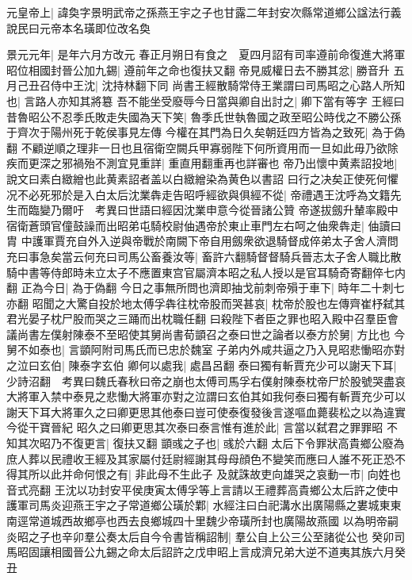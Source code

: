 元皇帝上|{
	諱奐字景明武帝之孫燕王宇之子也甘露二年封安次縣常道鄉公諡法行義說民曰元帝本名璜即位改名奐}


景元元年|{
	是年六月方改元}
春正月朔日有食之　夏四月詔有司率遵前命復進大將軍昭位相國封晉公加九錫|{
	遵前年之命也復扶又翻}
帝見威權日去不勝其忿|{
	勝音升}
五月己丑召侍中王沈|{
	沈持林翻下同}
尚書王經散騎常侍王業謂曰司馬昭之心路人所知也|{
	言路人亦知其將簒}
吾不能坐受廢辱今日當與卿自出討之|{
	卿下當有等字}
王經曰昔魯昭公不忍季氏敗走失國為天下笑|{
	魯季氏世執魯國之政至昭公時伐之不勝公孫于齊次于陽州死于乾侯事見左傳}
今權在其門為日久矣朝廷四方皆為之致死|{
	為于偽翻}
不顧逆順之理非一日也且宿衛空闕兵甲寡弱陛下何所資用而一旦如此毋乃欲除疾而更深之邪禍殆不測宜見重詳|{
	重直用翻重再也詳審也}
帝乃出懷中黄素詔投地|{
	說文曰素白緻繒也此黄素詔者盖以白緻繒染為黄色以書詔}
曰行之决矣正使死何懼况不必死邪於是入白太后沈業犇走告昭呼經欲與俱經不從|{
	帝禮遇王沈呼為文籍先生而臨變乃爾吁　考異曰世語曰經因沈業申意今從晉諸公贊}
帝遂拔劔升輦率殿中宿衛蒼頭官僮鼓譟而出昭弟屯騎校尉伷遇帝於東止車門左右呵之伷衆犇走|{
	伷讀曰胄}
中護軍賈充自外入逆與帝戰於南闕下帝自用劔衆欲退騎督成倅弟太子舍人濟問充曰事急矣當云何充曰司馬公畜養汝等|{
	畜許六翻騎督督騎兵晉志太子舍人職比散騎中書等侍郎時未立太子不應置東宫官屬濟本昭之私人授以是官耳騎奇寄翻倅七内翻}
正為今日|{
	為于偽翻}
今日之事無所問也濟即抽戈前刺帝殞于車下|{
	時年二十刺七亦翻}
昭聞之大驚自投於地太傅孚犇往枕帝股而哭甚哀|{
	枕帝於股也左傳齊崔杼弑其君光晏子枕尸股而哭之三踊而出枕職任翻}
曰殺陛下者臣之罪也昭入殿中召羣臣會議尚書左僕射陳泰不至昭使其舅尚書荀顗召之泰曰世之論者以泰方於舅|{
	方比也}
今舅不如泰也|{
	言顗阿附司馬氏而已忠於魏室}
子弟内外咸共逼之乃入見昭悲慟昭亦對之泣曰玄伯|{
	陳泰字玄伯}
卿何以處我|{
	處昌呂翻}
泰曰獨有斬賈充少可以謝天下耳|{
	少詩沼翻　考異曰魏氏春秋曰帝之崩也太傅司馬孚右僕射陳泰枕帝尸於股號哭盡哀大將軍入禁中泰見之悲慟大將軍亦對之泣謂曰玄伯其如我何泰曰獨有斬賈充少可以謝天下耳大將軍久之曰卿更思其他泰曰豈可使泰復發後言遂嘔血薨裴松之以為違實今從干寶晉紀}
昭久之曰卿更思其次泰曰泰言惟有進於此|{
	言當以弑君之罪罪昭}
不知其次昭乃不復更言|{
	復扶又翻}
顗彧之子也|{
	彧於六翻}
太后下令罪狀高貴鄉公廢為庶人葬以民禮收王經及其家屬付廷尉經謝其母母顔色不變笑而應曰人誰不死正恐不得其所以此并命何恨之有|{
	非此母不生此子}
及就誅故吏向雄哭之哀動一市|{
	向姓也音式亮翻}
王沈以功封安平侯庚寅太傅孚等上言請以王禮葬高貴鄉公太后許之使中護軍司馬炎迎燕王宇之子常道鄉公璜於鄴|{
	水經注曰白祀溝水出廣陽縣之婁城東東南逕常道城西故鄉亭也西去良鄉城四十里魏少帝璜所封也廣陽故燕國}
以為明帝嗣炎昭之子也辛卯羣公奏太后自今令書皆稱詔制|{
	羣公自上公三公至諸從公也}
癸卯司馬昭固讓相國晉公九錫之命太后詔許之戊申昭上言成濟兄弟大逆不道夷其族六月癸丑

